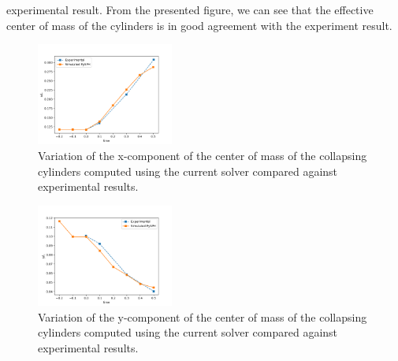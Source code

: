 experimental result. From the presented figure, we can see that the effective
center of mass of the cylinders is in good agreement with the experiment result.
\begin{figure}[!htpb]
  \centering
  \includegraphics[width=0.4\textwidth]{figures/rfc/figures/stack_of_cylinders_2d/Mohseni_Vyas/xcom}
  \caption{Variation of the x-component of the center of mass of the collapsing
    cylinders computed using the current solver compared against experimental
    results.}
\label{fig:x-com-stack-of-cylinders}
\end{figure}
\begin{figure}[!htpb]
  \centering
  \includegraphics[width=0.4\textwidth]{figures/rfc/figures/stack_of_cylinders_2d/Mohseni_Vyas/ycom}
  \caption{Variation of the y-component of the center of mass of the collapsing
    cylinders computed using the current solver compared against experimental
    results.}
\label{fig:y-com-stack-of-cylinders}
\end{figure}








